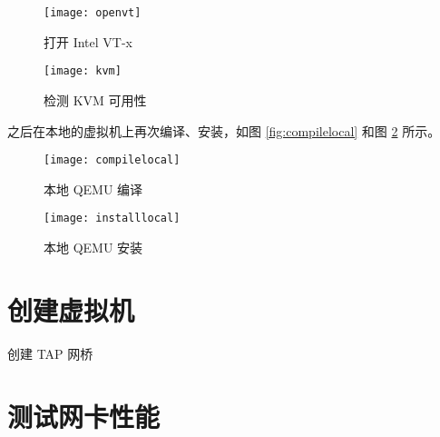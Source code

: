     \begin{figure}[h]
        \centering
        \begin{minipage}{0.48\textwidth}
            \centering
            \texttt{[image: openvt]}
            \caption{打开 Intel VT-x}\label{fig:openvt}
        \end{minipage}
        \begin{minipage}{0.48\textwidth}
            \centering
            \texttt{[image: kvm]}
            \caption{检测 KVM 可用性}\label{fig:kvm}
        \end{minipage}
    \end{figure}

    之后在本地的虚拟机上再次编译、安装，如图 \ref{fig:compilelocal} 和图 \ref{fig:installlocal} 所示。

    \begin{figure}[h]
        \centering
        \begin{minipage}{0.48\textwidth}
            \centering
            \texttt{[image: compilelocal]}
            \caption{本地 QEMU 编译}\label{fig:compilelocal}
        \end{minipage}
        \begin{minipage}{0.48\textwidth}
            \texttt{[image: installlocal]}
            \caption{本地 QEMU 安装}\label{fig:installlocal}
        \end{minipage}
    \end{figure}

    \section{创建虚拟机}
    
    创建 TAP 网桥\cite{tap}



    \section{测试网卡性能}



    
